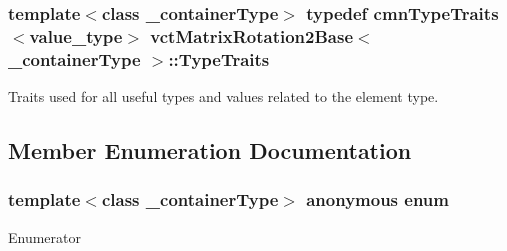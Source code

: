 \hypertarget{classvct_matrix_rotation2_base_abd9a728263fc154b76fecac0d9c19c4d}{
\subsubsection[{Type\-Traits}]{\setlength{\rightskip}{0pt plus 5cm}template$<$class \-\_\-container\-Type$>$ typedef {\bf cmn\-Type\-Traits}$<$value\-\_\-type$>$ {\bf vct\-Matrix\-Rotation2\-Base}$<$ \-\_\-container\-Type $>$\-::{\bf Type\-Traits}}}\label{classvct_matrix_rotation2_base_abd9a728263fc154b76fecac0d9c19c4d}
Traits used for all useful types and values related to the element type. 

\subsection{Member Enumeration Documentation}
\hypertarget{classvct_matrix_rotation2_base_aee21d1136c8b273c716774ceb24ea31b}{\subsubsection[{anonymous enum}]{\setlength{\rightskip}{0pt plus 5cm}template$<$class \-\_\-container\-Type$>$ anonymous enum}}\label{classvct_matrix_rotation2_base_aee21d1136c8b273c716774ceb24ea31b}
\begin{Desc}
\item[Enumerator]\par
\begin{description}
\item[{\em 
\hypertarget{classvct_matrix_rotation2_base_aee21d1136c8b273c716774ceb24ea31bad80015187d3670804554f4bd9cec3822}{R\-O\-W\-S}\label{classvct_matrix_rotation2_base_aee21d1136c8b273c716774ceb24ea31bad80015187d3670804554f4bd9cec3822}
}]\item[{\em 
\hypertarget{classvct_matrix_rotation2_base_aee21d1136c8b273c716774ceb24ea31babf5d0d692c30b7a19cc0c63d2bcc2113}{C\-O\-L\-S}\label{classvct_matrix_rotation2_base_aee21d1136c8b273c716774ceb24ea31babf5d0d692c30b7a19cc0c63d2bcc2113}
}]\end{description}
\end{Desc}

